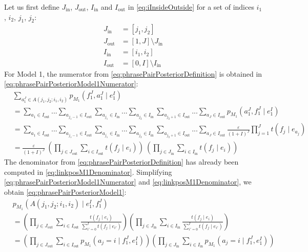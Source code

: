Let us first define $J_{\text{in}}$, $J_{\text{out}}$, $I_{\text{in}}$ and
$I_{\text{out}}$ in \autoref{eq:iInsideOutside} for a set of indices
$i_1$, $i_2$, $j_1$, $j_2$:
%
\begin{equation}
\begin{split}
  J_{\text{in}} &= [j_1, j_2] \\
  J_{\text{out}} &= [1,J] \setminus J_{\text{in}} \\
  I_{\text{in}} &= [i_1, i_2] \\
  I_{\text{out}} &= [0, I] \setminus I_{\text{in}}
\end{split}
\label{eq:iInsideOutside}
\end{equation}
%
For Model 1, the numerator from \autoref{eq:phrasePairPosteriorDefinition} is
obtained in \autoref{eq:phrasePairPosteriorModel1Numerator}:
%
\begin{align}
  & \sum_{a_1^J \in A(j_1, j_2; i_1, i_2)} p_{M_1}(f_1^J, a_1^J \mid e_1^I) \nonumber \\
  &= \sum_{a_1 \in I_{\text{out}}} ... \sum_{a_{j_1-1} \in I_{\text{out}}} \sum_{a_{j_1} \in I_{\text{in}}} ... \sum_{a_{j_2} \in I_{\text{in}}} \sum_{a_{j_2 + 1} \in I_{\text{out}}} ... \sum_{a_J \in I_{\text{out}}} p_{M_1}(a_1^J, f_1^J \mid e_1^I) \nonumber \\
  &= \sum_{a_1 \in I_{\text{out}}} ... \sum_{a_{j_1-1} \in I_{\text{out}}} \sum_{a_{j_1} \in I_{\text{in}}} ... \sum_{a_{j_2} \in I_{\text{in}}} \sum_{a_{j_2 + 1} \in I_{\text{out}}} ... \sum_{a_J \in I_{\text{out}}} \frac{\varepsilon}{(1+I)^J} \prod_{j = 1}^J t(f_j \mid e_{a_j}) \nonumber \\
  &= \frac{\varepsilon}{(1+I)^J} \ \left( \prod_{j \in J_{\text{out}}} \sum_{i \in I_{\text{out}}} t(f_j \mid e_i) \right) \ \left( \prod_{j \in J_{\text{in}}} \sum_{i \in I_{\text{in}}} t(f_j \mid e_i) \right)
  \label{eq:phrasePairPosteriorModel1Numerator}
\end{align}
%
The denominator from \autoref{eq:phrasePairPosteriorDefinition} has already been
computed in \autoref{eq:linkposM1Denominator}.
Simplifying \autoref{eq:phrasePairPosteriorModel1Numerator} and
\autoref{eq:linkposM1Denominator}, we obtain
\autoref{eq:phrasePairPosteriorModel1}:
%
\begin{align}
  & p_{M_1}(A(j_1, j_2; i_1, i_2) \mid e_1^I, f_1^J) \nonumber \\
  &= \left( \prod_{j \in J_{\text{out}}} \sum_{i \in I_{\text{out}}} \frac{t(f_j \mid e_i)}{\sum_{i' = 0}^I t(f_{j} \mid e_{i'})} \right)  \left( \prod_{j \in J_{\text{in}}} \sum_{i \in I_{\text{in}}} \frac{t(f_j \mid e_i)}{\sum_{i' = 0}^I t(f_{j} \mid e_{i'})} \right) \nonumber \\
  &= \left( \prod_{j \in J_{\text{out}}} \sum_{i \in I_{\text{out}}} p_{M_1}(a_j = i \mid f_1^J, e_1^I) \right) \left( \prod_{j \in J_{\text{in}}} \sum_{i \in I_{\text{in}}} p_{M_1}(a_j = i \mid f_1^J, e_1^I) \right)
  \label{eq:phrasePairPosteriorModel1}
\end{align}
%

